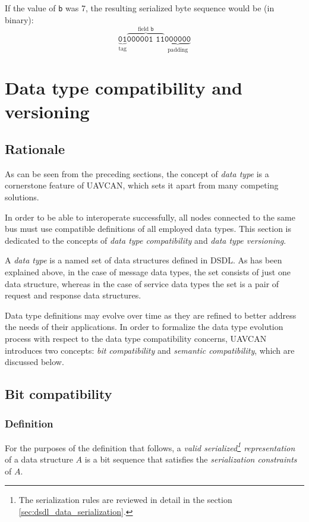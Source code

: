 If the value of \verb|b| was 7, the resulting serialized byte sequence would be (in binary):
$$%
\underbrace{\texttt{01}}_{\text{tag}}%
\overbrace{\texttt{000001 11}}^{\text{field }\texttt{b}}%
\underbrace{\texttt{000000}}_{\text{padding}}%
$$

\section{Data type compatibility and versioning}\label{sec:dsdl_versioning}

\subsection{Rationale}

As can be seen from the preceding sections,
the concept of \emph{data type} is a cornerstone feature of UAVCAN,
which sets it apart from many competing solutions.

In order to be able to interoperate successfully,
all nodes connected to the same bus must use compatible definitions of all employed data types.
This section is dedicated to the concepts of \emph{data type compatibility}
and \emph{data type versioning}.

A \emph{data type} is a named set of data structures defined in DSDL.
As has been explained above, in the case of message data types,
the set consists of just one data structure, whereas in the case of service data types
the set is a pair of request and response data structures.

Data type definitions may evolve over time as they are refined to better address the needs of their applications.
In order to formalize the data type evolution process with respect to the data type compatibility concerns,
UAVCAN introduces two concepts: \emph{bit compatibility} and \emph{semantic compatibility},
which are discussed below.

\subsection{Bit compatibility}

\subsubsection{Definition}

For the purposes of the definition that follows, a \emph{valid
serialized\footnote{The serialization rules are reviewed in detail in the section \ref{sec:dsdl_data_serialization}.}
representation} of a data structure $A$ is a bit sequence that satisfies the \emph{serialization constraints} of $A$.

